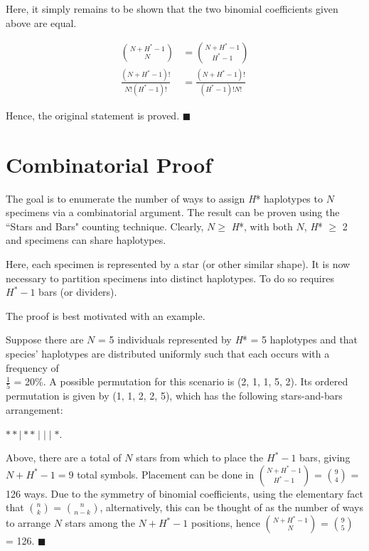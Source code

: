 Here, it simply remains to be shown that the two binomial coefficients given above are equal. 

\vspace{5mm}

\begin{align*}
\binom{N + H^* - 1}{N} &= \binom{N + H^* - 1}{H^* - 1} \\
\frac{(N + H^* - 1)!}{N!(H^* - 1)!} &= \frac{(N + H^* - 1)!}{(H^* - 1)!N!}  
\end{align*} 

Hence, the original statement is proved. $\blacksquare$ 



\section{Combinatorial Proof}

The goal is to enumerate the number of ways to assign \textit{H}* haplotypes to $N$ specimens via a combinatorial argument. The result can be proven using the ``Stars and Bars" counting technique. Clearly, $N \geq$ \textit{H}*, with both $N$, \textit{H}* $\geq$ 2 and specimens can share haplotypes.

\vspace{5mm} 

Here, each specimen is represented by a star (or other similar shape). It is now necessary to partition specimens into distinct haplotypes. To do so requires $H^* - 1$ bars (or dividers). 

\vspace{5mm}

The proof is best motivated with an example.

\vspace{5mm}

Suppose there are $N$ = 5 individuals represented by \textit{H}* = 5 haplotypes and that species' haplotypes are distributed uniformly such that each occurs with a frequency of \\ $\frac{1}{5}$ = 20\%. A possible permutation for this scenario is (2, 1, 1, 5, 2). Its ordered permutation is given by (1, 1, 2, 2, 5), which has the following stars-and-bars arrangement:

\begin{center}
$* * \mid * * \mid \mid \mid *$.
\end{center}

\noindent Above, there are a total of $N$ stars from which to place the $H^* - 1$ bars, giving $N + H^* - 1 = 9$ total symbols. Placement can be done in ${N + H^* - 1}\choose{H^* - 1}$ = ${9}\choose{4}$ = 126 ways. Due to the symmetry of binomial coefficients, using the elementary fact that ${n}\choose{k}$ = ${n}\choose{n-k}$, alternatively, this can be thought of as the number of ways to arrange $N$ stars among the $N + H^* - 1$ positions, hence ${N + H^* - 1}\choose{N}$ = ${9}\choose{5}$ = 126. $\blacksquare$ 

